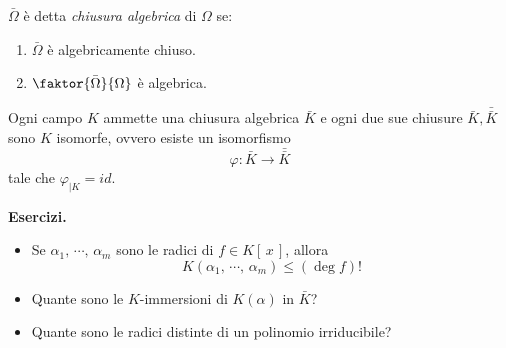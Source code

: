 \begin{multicols}{2}
\begin{definition}
	$ \bar{\Omega} $ è detta \emph{chiusura algebrica} di $ \Omega $ se:
	\begin{enumerate}
		\item $ \bar{\Omega} $ è algebricamente chiuso.
		\item $ \faktor{\bar{\Omega}}{\Omega} $ è algebrica.
	\end{enumerate}
\end{definition}

\begin{theorem}
	Ogni campo $ K $ ammette una chiusura algebrica $ \bar{K} $ e ogni due sue chiusure $ \bar{K}, \bar{\bar{K}} $ sono $ K $ isomorfe, ovvero esiste un isomorfismo
	\[ \varphi : \bar{K} \to \bar{\bar{K}} \]
	tale che $ \varphi_{|K} = id $.
\end{theorem}

\textbf{Esercizi.}
\begin{itemize}
	\item Se $ \alpha_1,\, \cdots,\, \alpha_m $ sono le radici di $ f \in K[\,x\,] $, allora
	 \[ K(\alpha_1,\, \cdots,\, \alpha_m) \leq (\deg f)! \]
	 
	 \item Quante sono le $ K $-immersioni di $ K(\alpha) $ in $ \bar{K} $?
	 
	 \item Quante sono le radici distinte di un polinomio irriducibile?
\end{itemize}


\end{multicols}


